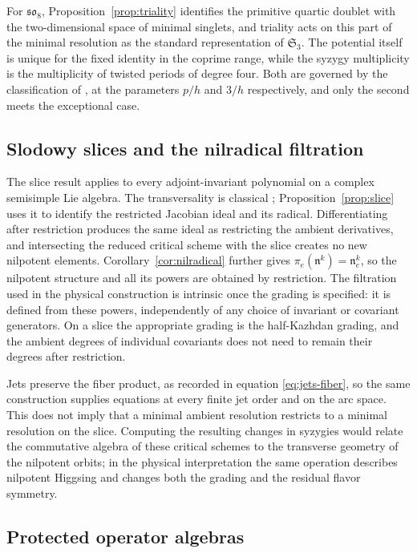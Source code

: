 \documentclass[10pt,reqno]{amsart}
\numberwithin{equation}{section}
\theoremstyle{plain}
\theoremstyle{definition}
\newcommand{\Sym}{\mathfrak{S}}
\begin{document}
For $\mathfrak{so}_8$, Proposition~\ref{prop:triality} identifies the primitive quartic doublet with the two-dimensional space of minimal singlets, and triality acts on this part of the minimal resolution as the standard representation of $\Sym_3$. The potential itself is unique for the fixed identity in the coprime range, while the syzygy multiplicity is the multiplicity of twisted periods of degree four. Both are governed by the classification of \cite{FS}, at the parameters $p/h$ and $3/h$ respectively, and only the second meets the exceptional case.

\subsection{Slodowy slices and the nilradical filtration}

The slice result applies to every adjoint-invariant polynomial on a complex semisimple Lie algebra. The transversality is classical \cite{Slodowy,LNS}; Proposition~\ref{prop:slice} uses it to identify the restricted Jacobian ideal and its radical. Differentiating after restriction produces the same ideal as restricting the ambient derivatives, and intersecting the reduced critical scheme with the slice creates no new nilpotent elements. Corollary~\ref{cor:nilradical} further gives $\pi_e(\mathfrak{n}^k)=\mathfrak{n}_e^k$, so the nilpotent structure and all its powers are obtained by restriction. The filtration used in the physical construction is intrinsic once the grading is specified: it is defined from these powers, independently of any choice of invariant or covariant generators. On a slice the appropriate grading is the half-Kazhdan grading, and the ambient degrees of individual covariants does not need to remain their degrees after restriction.

Jets preserve the fiber product, as recorded in equation \eqref{eq:jets-fiber}, so the same construction supplies equations at every finite jet order and on the arc space. This does not imply that a minimal ambient resolution restricts to a minimal resolution on the slice. Computing the resulting changes in syzygies would relate the commutative algebra of these critical schemes to the transverse geometry of the nilpotent orbits; in the physical interpretation the same operation describes nilpotent Higgsing and changes both the grading and the residual flavor symmetry.

\subsection{Protected operator algebras}
\end{document}
